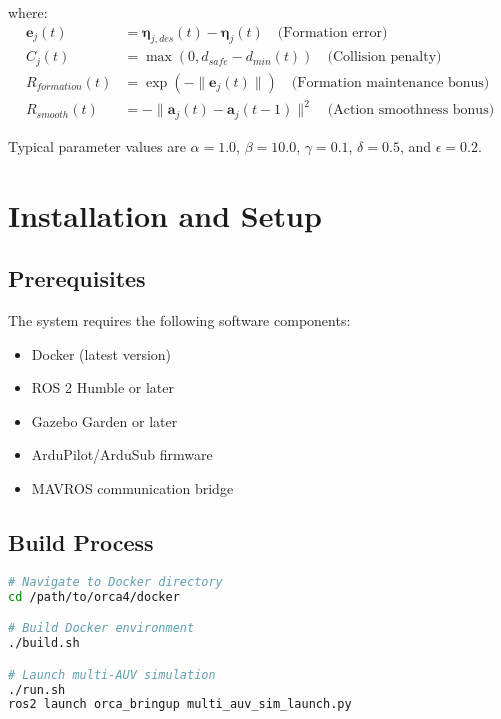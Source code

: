 \documentclass[11pt,a4paper]{article}
\newcommand{\vect}[1]{\boldsymbol{#1}}
\begin{document}
where:
\begin{align}
\vect{e}_j(t) &= \vect{\eta}_{j,des}(t) - \vect{\eta}_j(t) \quad \text{(Formation error)}\\
C_j(t) &= \max(0, d_{safe} - d_{min}(t)) \quad \text{(Collision penalty)}\\
R_{formation}(t) &= \exp(-\|\vect{e}_j(t)\|) \quad \text{(Formation maintenance bonus)}\\
R_{smooth}(t) &= -\|\vect{a}_j(t) - \vect{a}_j(t-1)\|^2 \quad \text{(Action smoothness bonus)}
\end{align}

Typical parameter values are $\alpha = 1.0$, $\beta = 10.0$, $\gamma = 0.1$, $\delta = 0.5$, and $\epsilon = 0.2$.

\section{Installation and Setup}

\subsection{Prerequisites}

The system requires the following software components:
\begin{itemize}
    \item Docker (latest version)
    \item ROS 2 Humble or later
    \item Gazebo Garden or later
    \item ArduPilot/ArduSub firmware
    \item MAVROS communication bridge
\end{itemize}

\subsection{Build Process}

\begin{lstlisting}[language=bash, caption=System Build Commands]
# Navigate to Docker directory
cd /path/to/orca4/docker

# Build Docker environment
./build.sh

# Launch multi-AUV simulation
./run.sh
ros2 launch orca_bringup multi_auv_sim_launch.py
\end{lstlisting}
\end{document}
